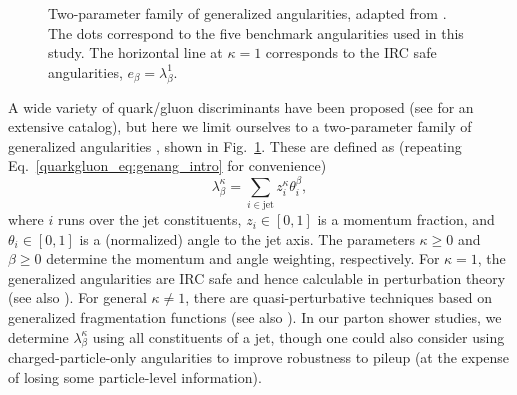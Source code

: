 \documentclass[11pt]{cernrep}
\begin{document}
\begin{figure}
\centering
{}
\caption{Two-parameter family of generalized angularities, adapted from \cite{Larkoski:2014pca}.  The dots correspond to the five benchmark angularities used in this study.  The horizontal line at $\kappa = 1$ corresponds to the IRC safe angularities, $e_\beta = \lambda^{1}_{\beta}$.}
\label{quarkgluon_fig:lambda_space}
\end{figure}

A wide variety of quark/gluon discriminants have been proposed (see \cite{Gallicchio:2012ez} for an extensive catalog), but here we limit ourselves to a two-parameter family of generalized angularities \cite{Larkoski:2014pca}, shown in Fig.~\ref{quarkgluon_fig:lambda_space}.  These are defined as (repeating Eq.~\eqref{quarkgluon_eq:genang_intro} for convenience)
\begin{equation}
\label{quarkgluon_eq:genang}
\lambda^{\kappa}_{\beta} = \sum_{i \in \text{jet}} z_i^\kappa \theta_i^\beta,
\end{equation}
where $i$ runs over the jet constituents, $z_i \in [0,1]$ is a momentum fraction, and $\theta_i \in [0,1]$ is a (normalized) angle to the jet axis.  The parameters $\kappa \ge 0$ and $\beta \ge 0$ determine the momentum and angle weighting, respectively.  For $\kappa = 1$, the generalized angularities are IRC safe and hence calculable in perturbation theory \cite{Larkoski:2014uqa} (see also \cite{Ellis:2010rwa,Larkoski:2013paa,Larkoski:2014tva,Procura:2014cba,Hornig:2016ahz}).  For general $\kappa \not= 1$, there are quasi-perturbative techniques based on generalized fragmentation functions \cite{Larkoski:2014pca} (see also \cite{Krohn:2012fg,Waalewijn:2012sv,Chang:2013rca,Chang:2013iba}).  In our parton shower studies, we determine $\lambda^{\kappa}_{\beta}$ using all constituents of a jet, though one could also consider using charged-particle-only angularities to improve robustness to pileup (at the expense of losing some particle-level information).
\end{document}
